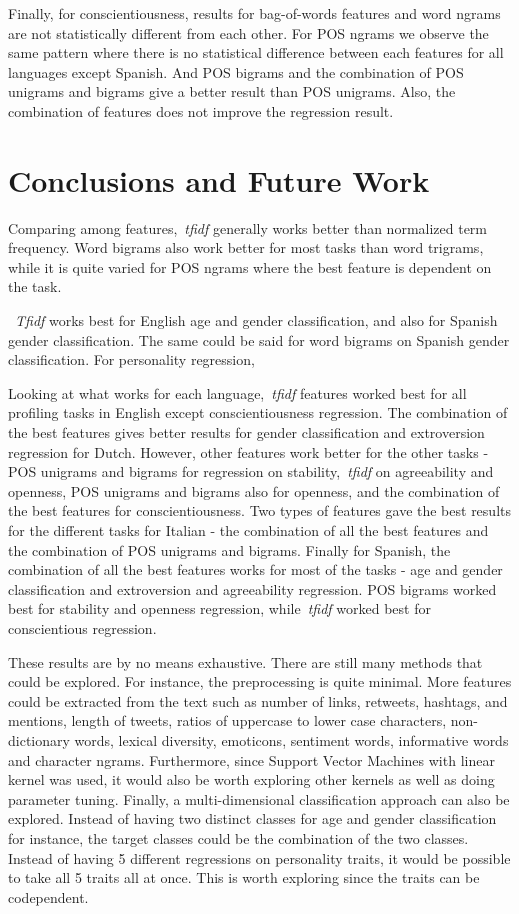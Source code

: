 \documentclass[a4paper]{llncs}
\begin{document}
Finally, for conscientiousness, results for bag-of-words features and word ngrams are not statistically different from each other. For POS ngrams we observe the same pattern where there is no statistical difference between each features for all languages except Spanish. And POS bigrams and the combination of POS unigrams and bigrams give a better result than POS unigrams. Also, the combination of features does not improve the regression result. 



\section{Conclusions and Future Work}
Comparing among features,~\textit{tfidf} generally works better than normalized term frequency. Word bigrams also work better for most tasks than word trigrams, while it is quite varied for POS ngrams where the best feature is dependent on the task. 

~\textit{Tfidf} works best for English age and gender classification, and also for Spanish gender classification. The same could be said for word bigrams on Spanish gender classification. For personality regression, 

Looking at what works for each language,~\textit{tfidf} features worked best for all profiling tasks in English except conscientiousness regression. The combination of the best features gives better results for gender classification and extroversion regression for Dutch. However, other features work better for the other tasks - POS unigrams and bigrams for regression on stability,~\textit{tfidf} on agreeability and openness, POS unigrams and bigrams also for openness, and the combination of the best features for conscientiousness. Two types of features gave the best results for the different tasks for Italian - the combination of all the best features and the combination of POS unigrams and bigrams. Finally for Spanish, the combination of all the best features works for most of the tasks - age and gender classification and extroversion and agreeability regression. POS bigrams worked best for stability and openness regression, while~\textit{tfidf} worked best for conscientious regression.

These results are by no means exhaustive. There are still many methods that could be explored. For instance, the preprocessing is quite minimal. More features could be extracted from the text such as number of links, retweets, hashtags, and mentions, length of tweets, ratios of uppercase to lower case characters, non-dictionary words, lexical diversity, emoticons, sentiment words, informative words and character ngrams. Furthermore, since Support Vector Machines with linear kernel was used, it would also be worth exploring other kernels as well as doing parameter tuning. Finally, a multi-dimensional classification approach can also be explored. Instead of having two distinct classes for age and gender classification for instance, the target classes could be the combination of the two classes. Instead of having 5 different regressions on personality traits, it would be possible to take all 5 traits all at once. This is worth exploring since the traits can be codependent. 





\end{document}
